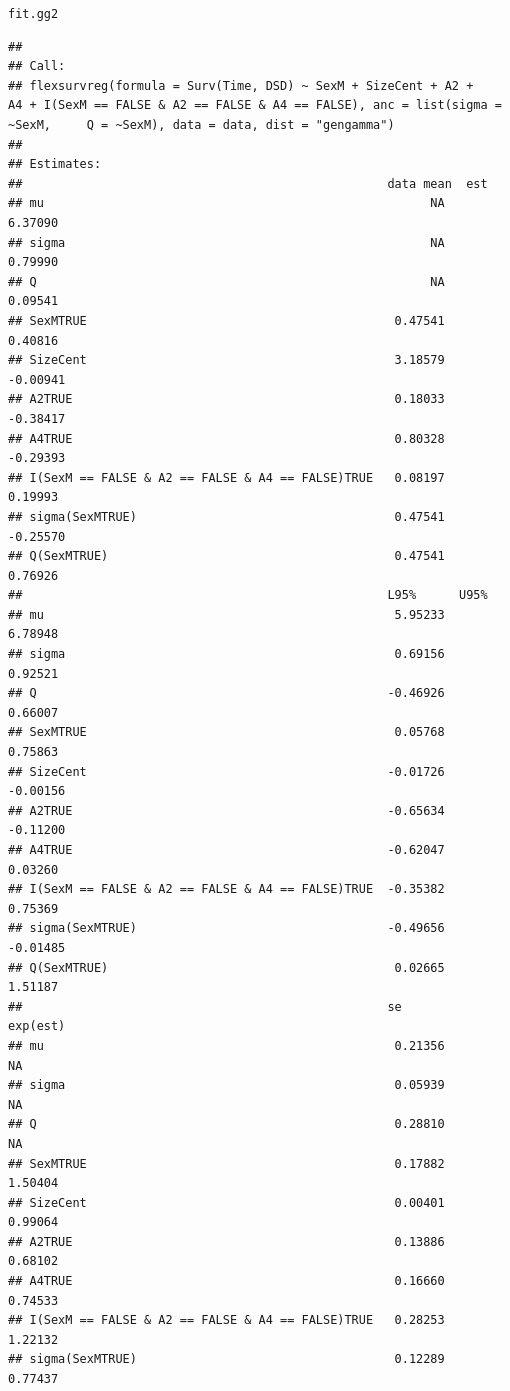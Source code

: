 \documentclass{article}\usepackage[]{graphicx}\usepackage[]{color}
\makeatletter
\newcommand{\hlstd}[1]{\textcolor[rgb]{0.345,0.345,0.345}{#1}}%
\newenvironment{kframe}{%
 \def\at@end@of@kframe{}%
 \ifinner\ifhmode%
  \def\at@end@of@kframe{\end{minipage}}%
  \begin{minipage}{\columnwidth}%
 \fi\fi%
 \def\FrameCommand##1{\hskip\@totalleftmargin \hskip-\fboxsep
 \colorbox{shadecolor}{##1}\hskip-\fboxsep
     \hskip-\linewidth \hskip-\@totalleftmargin \hskip\columnwidth}%
 \MakeFramed {\advance\hsize-\width
   \@totalleftmargin\z@ \linewidth\hsize
   \@setminipage}}%
 {\par\unskip\endMakeFramed%
 \at@end@of@kframe}
\newenvironment{knitrout}{}{} %
\makeatother
\begin{document}
\begin{knitrout}
\begin{kframe}
\begin{alltt}
\hlstd{fit.gg2}
\end{alltt}
\begin{verbatim}
## 
## Call:
## flexsurvreg(formula = Surv(Time, DSD) ~ SexM + SizeCent + A2 +     A4 + I(SexM == FALSE & A2 == FALSE & A4 == FALSE), anc = list(sigma = ~SexM,     Q = ~SexM), data = data, dist = "gengamma")
## 
## Estimates: 
##                                                   data mean  est     
## mu                                                      NA    6.37090
## sigma                                                   NA    0.79990
## Q                                                       NA    0.09541
## SexMTRUE                                           0.47541    0.40816
## SizeCent                                           3.18579   -0.00941
## A2TRUE                                             0.18033   -0.38417
## A4TRUE                                             0.80328   -0.29393
## I(SexM == FALSE & A2 == FALSE & A4 == FALSE)TRUE   0.08197    0.19993
## sigma(SexMTRUE)                                    0.47541   -0.25570
## Q(SexMTRUE)                                        0.47541    0.76926
##                                                   L95%      U95%    
## mu                                                 5.95233   6.78948
## sigma                                              0.69156   0.92521
## Q                                                 -0.46926   0.66007
## SexMTRUE                                           0.05768   0.75863
## SizeCent                                          -0.01726  -0.00156
## A2TRUE                                            -0.65634  -0.11200
## A4TRUE                                            -0.62047   0.03260
## I(SexM == FALSE & A2 == FALSE & A4 == FALSE)TRUE  -0.35382   0.75369
## sigma(SexMTRUE)                                   -0.49656  -0.01485
## Q(SexMTRUE)                                        0.02665   1.51187
##                                                   se        exp(est)
## mu                                                 0.21356        NA
## sigma                                              0.05939        NA
## Q                                                  0.28810        NA
## SexMTRUE                                           0.17882   1.50404
## SizeCent                                           0.00401   0.99064
## A2TRUE                                             0.13886   0.68102
## A4TRUE                                             0.16660   0.74533
## I(SexM == FALSE & A2 == FALSE & A4 == FALSE)TRUE   0.28253   1.22132
## sigma(SexMTRUE)                                    0.12289   0.77437

\end{verbatim}
\end{kframe}
\end{knitrout}
\end{document}
